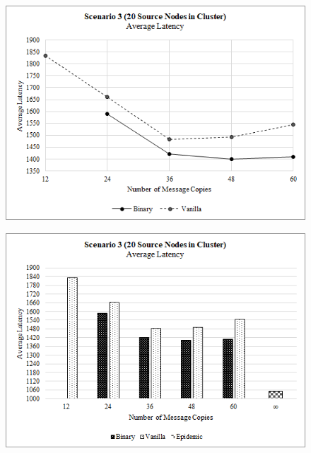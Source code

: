 \documentclass{article}
\begin{document}
\begin{figure}[h!]
\centering
\begin{minipage}[t]{.5\textwidth}
  \centering
  \includegraphics[width=.98\linewidth]{Results/Graphs/AverageLatency/S3_AverageLatency_SprayAndWaitComparison.png}
  \label{fig:test1}
\end{minipage}%
\begin{minipage}[t]{.5\textwidth}
  \centering
  \includegraphics[width=.98\linewidth]{Results/Graphs/AverageLatency/S3_AverageLatency_AllComparison.png}
  \label{fig:test2}
\end{minipage}


\end{figure}
\end{document}
